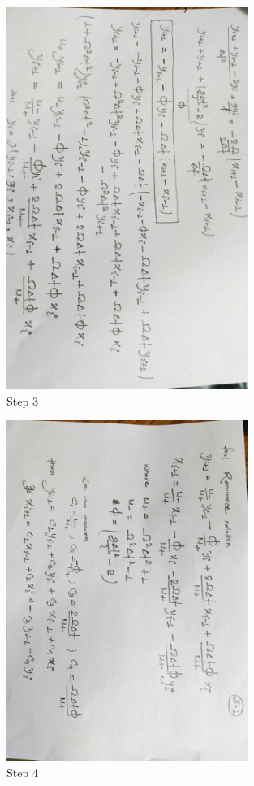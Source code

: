 \documentclass[12pt,a4paper]{article}
\begin{document}
\begin{figure}[H]
    \centering
    \includegraphics[width=0.7\textwidth,angle=90]{calc3.jpeg}
    \caption{Step 3}
\end{figure}

\begin{figure}[H]
    \centering
    \includegraphics[width=0.7\textwidth,angle=90]{calc4.jpeg}
    \caption{Step 4}
\end{figure}
\end{document}
